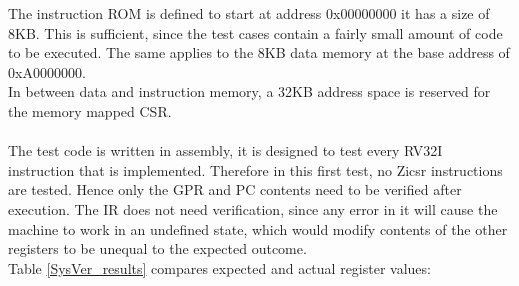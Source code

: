 The instruction \ac{ROM} is defined to start at address 0x00000000 it has a size of 8KB. This is sufficient, since the test cases contain a fairly small amount of code to be executed. The same applies to the 8KB data memory at the base address of 0xA0000000.\\
In between data and instruction memory, a 32KB address space is reserved for the memory mapped \ac{CSR}.\\
\\
The test code is written in assembly, it is designed to test every RV32I instruction that is implemented. Therefore in this first test, no Zicsr instructions are tested. Hence only the \ac{GPR} and \ac{PC} contents need to be verified after execution. The \ac{IR} does not need verification, since any error in it will cause the machine to work in an undefined state, which would modify contents of the other registers to be unequal to the expected outcome.\\
Table \ref{SysVer_results} compares expected and actual register values:

